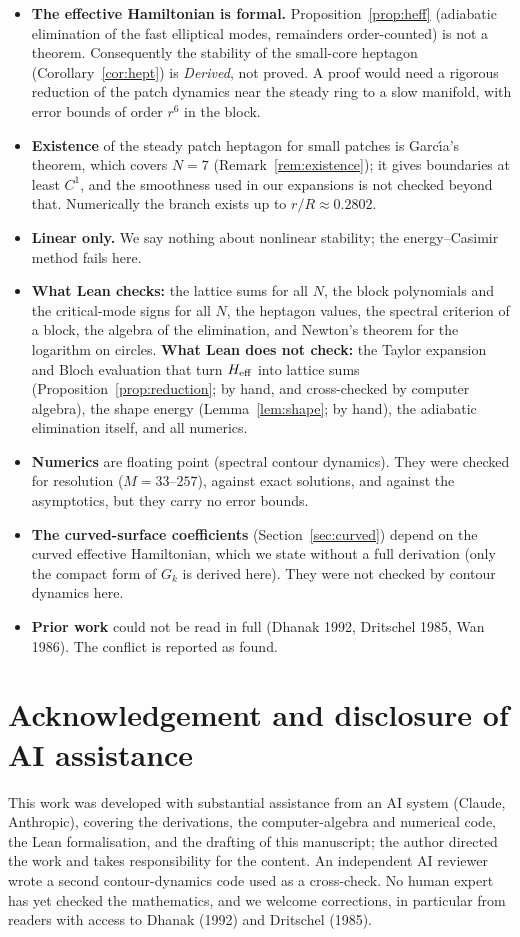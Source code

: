 \documentclass[11pt]{article}
\theoremstyle{definition}
\theoremstyle{remark}
\begin{document}
\begin{itemize}
\item \textbf{The effective Hamiltonian is formal.} Proposition~\ref{prop:heff} (adiabatic elimination of the fast
elliptical modes, remainders order-counted) is not a theorem. Consequently the stability of the small-core heptagon
(Corollary~\ref{cor:hept}) is \emph{Derived}, not proved. A proof would need a rigorous reduction of the patch dynamics
near the steady ring to a slow manifold, with error bounds of order $r^6$ in the block.
\item \textbf{Existence} of the steady patch heptagon for small patches is Garc\'\i a's theorem, which covers $N=7$
(Remark~\ref{rem:existence}); it gives boundaries at least $C^1$, and the smoothness used in our expansions is not checked
beyond that. Numerically the branch exists up to $r/R\approx0.2802$.
\item \textbf{Linear only.} We say nothing about nonlinear stability; the energy--Casimir method fails here.
\item \textbf{What Lean checks:} the lattice sums for all $N$, the block polynomials and the critical-mode signs for all $N$,
the heptagon values, the spectral criterion of a block, the algebra of the elimination, and Newton's theorem for the
logarithm on circles. \textbf{What Lean does not check:} the Taylor expansion and Bloch evaluation that turn $H_{\rm eff}$ into
lattice sums (Proposition~\ref{prop:reduction}; by hand, and cross-checked by computer algebra), the shape energy
(Lemma~\ref{lem:shape}; by hand), the adiabatic elimination itself, and all numerics.
\item \textbf{Numerics} are floating point (spectral contour dynamics). They were checked for resolution
($M=33$--$257$), against exact solutions, and against the asymptotics, but they carry no error bounds.
\item \textbf{The curved-surface coefficients} (Section~\ref{sec:curved}) depend on the curved effective Hamiltonian, which we
state without a full derivation (only the compact form of $G_k$ is derived here). They were not checked by contour dynamics here.
\item \textbf{Prior work} could not be read in full (Dhanak 1992, Dritschel 1985, Wan 1986). The conflict is reported as found.
\end{itemize}

\section*{Acknowledgement and disclosure of AI assistance}
This work was developed with substantial assistance from an AI system (Claude, Anthropic), covering the derivations, the
computer-algebra and numerical code, the Lean formalisation, and the drafting of this manuscript; the author directed the
work and takes responsibility for the content. An independent AI reviewer wrote a second contour-dynamics code used as a
cross-check. No human expert has yet checked the mathematics, and we welcome corrections, in particular from readers with
access to Dhanak (1992) and Dritschel (1985).
\end{document}
